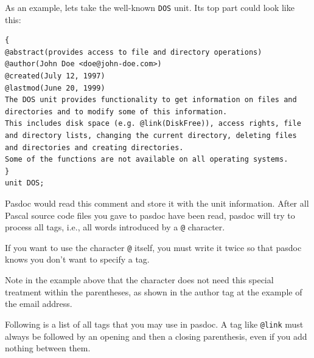 \documentclass[11pt]{article}
\begin{document}
As an example, lets take the well-known {\tt DOS} unit.
Its top part could look like this:
\begin{verbatim}
{
@abstract(provides access to file and directory operations)
@author(John Doe <doe@john-doe.com>)
@created(July 12, 1997)
@lastmod(June 20, 1999)
The DOS unit provides functionality to get information on files and
directories and to modify some of this information.
This includes disk space (e.g. @link(DiskFree)), access rights, file
and directory lists, changing the current directory, deleting files
and directories and creating directories.
Some of the functions are not available on all operating systems.
}
unit DOS;
\end{verbatim}

Pasdoc would read this comment and store it with the unit information.
After all Pascal source code files you gave to pasdoc have been read,
pasdoc will try to process all tags, i.e., all words introduced by a
{\tt @} character.

If you want to use the character {\tt @} itself, you must write it twice
so that pasdoc knows you don't want to specify a tag.

Note in the example above that the character does not need this
special treatment within the parentheses, as shown in the author tag
at the example of the email address.

Following is a list of all tags that you may use in pasdoc.
A tag like {\tt @link} must always be followed by an opening
and then a closing parenthesis, even if you add nothing between them.
\end{document}
